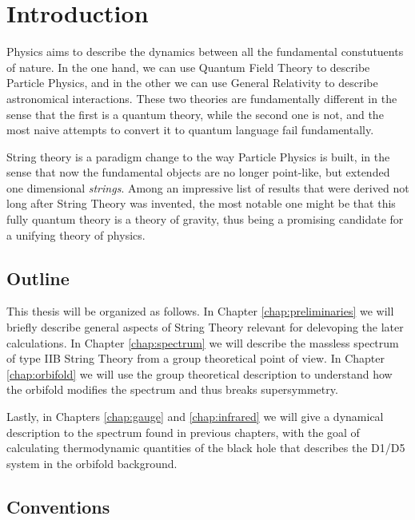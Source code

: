 

\chapter{Introduction}
\label{chap:intro}
\pagestyle{fancy}









Physics aims to describe the dynamics between all the fundamental constutuents of nature. In the one hand, we can use Quantum Field Theory to describe Particle Physics, and in the other we can use General Relativity to describe astronomical interactions. These two theories are fundamentally different in the sense that the first is a quantum theory, while the second one is not, and the most naive attempts to convert it to quantum language fail fundamentally.

String theory is a paradigm change to the way Particle Physics is built, in the sense that now the fundamental objects are no longer point-like, but extended one dimensional \textit{strings}. Among an impressive list of results that were derived not long after String Theory was invented, the most notable one might be that this fully quantum theory is a theory of gravity, thus being a promising candidate for a unifying theory of physics.



\section{Outline}

This thesis will be organized as follows. In Chapter \ref{chap:preliminaries} we will briefly describe general aspects of String Theory relevant for delevoping the later calculations. In Chapter \ref{chap:spectrum} we will describe the massless spectrum of type IIB String Theory from a group theoretical point of view. In Chapter \ref{chap:orbifold} we will use the group theoretical description to understand how the orbifold modifies the spectrum and thus breaks supersymmetry.

Lastly, in Chapters \ref{chap:gauge} and \ref{chap:infrared} we will give a dynamical description to the spectrum found in previous chapters, with the goal of calculating thermodynamic quantities of the black hole that describes the D1/D5 system in the orbifold background.

\section{Conventions}